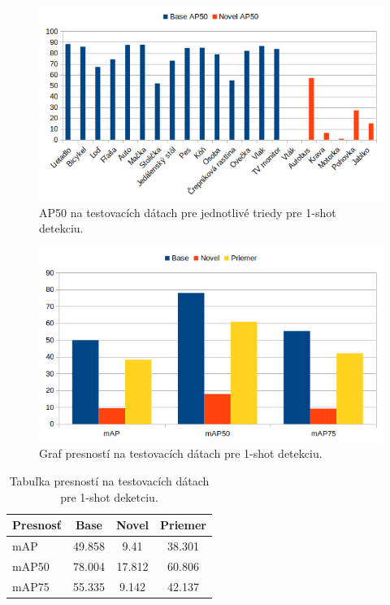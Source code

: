 \begin{figure}[H]
\includegraphics[width=\textwidth]{images/1_shot_classes_AP50.png}
\centering
\caption{AP50 na testovacích dátach pre jednotlivé triedy pre 1-shot detekciu.}
\label{fig:image18}
\end{figure}

\begin{figure}[H]
\includegraphics[width=\textwidth]{images/1_shot_meanAP.png}
\centering
\caption{Graf presností na testovacích dátach pre 1-shot detekciu.}
\label{fig:image20}
\end{figure}

\begin{table}[H]
\begin{tabular}{|l|c|c|c|}
\hline
\textbf{Presnosť} & \textbf{Base} & \textbf{Novel} & \textbf{Priemer} \\
\hline
mAP & 49.858 & 9.41 & 38.301 \\
mAP50 & 78.004 & 17.812 & 60.806 \\
mAP75 & 55.335 & 9.142 & 42.137 \\
\hline
\end{tabular}
\centering
\caption{Tabuľka presností na testovacích dátach pre 1-shot deketciu.}
\label{tab:table1}
\end{table}


